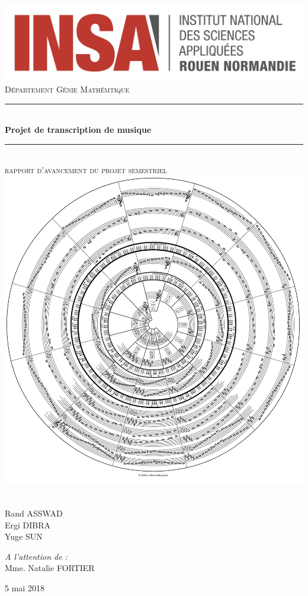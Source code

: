 \documentclass[a4paper]{article}
\newcommand{\HRule}{\rule{\linewidth}{0.5mm}}
\begin{document}
\begin{titlepage}
  \begin{sffamily}
  \begin{center}

    \includegraphics[scale=0.15]{INSA_logo}\\[2cm]

    \textsc{\huge Département Génie Mathémtique}\\[0.7cm]

    \HRule \\[0.4cm]
    {\huge \bfseries Projet de transcription de musique \\[0.4cm]}
    \HRule \\[1cm]
	\textsc{\huge rapport d'avancement du projet semestriel}\\[0.7cm]

    \includegraphics[width=.6\textwidth]{fifths_circle.png}~\\[1cm]

    \begin{minipage}{0.4\textwidth}
		\Large\raggedright
        Rand ASSWAD\\
		Ergi DIBRA\\
		Yuge SUN
    \end{minipage}
    \begin{minipage}{0.4\textwidth}
		\Large\raggedleft
		\emph{A l'attention de :}\\
		Mme. Natalie FORTIER
    \end{minipage}

	\vfill
    {\large 5 mai 2018}
  \end{center}
  \end{sffamily}
\end{titlepage}
\end{document}
